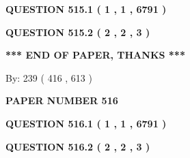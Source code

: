 \documentclass[12pt]{article}
\begin{document}
 
 
 
   
   
  
\vspace{0.2in}
  
{\textbf{\Large{QUESTION
515.1 
 ( 1 , 1 , 6791 )
}}}
  
  
  
\vspace{0.2in}
  
{\textbf{\Large{QUESTION
515.2 
 ( 2 , 2 , 3 )
}}}
  
  
   
   
 \vspace{0.2in}
 
   
   
   
   
\vspace{1.0in} 
{\textbf{\large{ *** END OF PAPER, THANKS *** }}} 
   
   
\hspace{1.0in} By: 
 239 ( 416 ,  613 )
   
   
   
   
\newpage 
\setcounter{page}{ 
   516001 } 
   
   
   
   
 {\textbf{ \Large{ PAPER NUMBER  516  }}}
   
   
\vspace{0.2in}
   
   
   
   
   
   
 \vspace{0.2in}
 
 
 
 
   
   
  
\vspace{0.2in}
  
{\textbf{\Large{QUESTION
516.1 
 ( 1 , 1 , 6791 )
}}}
  
  
  
\vspace{0.2in}
  
{\textbf{\Large{QUESTION
516.2 
 ( 2 , 2 , 3 )
}}}
  
  
   
   
 \vspace{0.2in}
 
   
   
   
   
\end{document}
